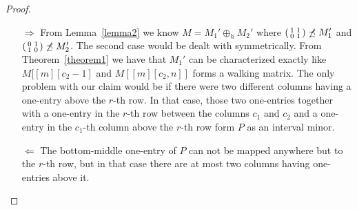 \begin{proof}
\begin{itemize}
\item[$\Rightarrow$] From Lemma~\ref{lemma2} we know $M=M_1'\oplus_hM_2'$ where $\left(\begin{smallmatrix}1&1\\0&1\end{smallmatrix}\right)\not\preceq M_1'$ and $\left(\begin{smallmatrix}0&1\\1&0\end{smallmatrix}\right)\not\preceq M_2'$. The second case would be dealt with symmetrically. From Theorem~\ref{theorem1} we have that $M_1'$ can be characterized exactly like $M[[m][c_2-1]$ and $M[[m][c_2,n]]$ forms a walking matrix. The only problem with our claim would be if there were two different columns having a one-entry above the $r$-th row. In that case, those two one-entries together with a one-entry in the $r$-th row between the columns $c_1$ and $c_2$ and a one-entry in the $c_1$-th column above the $r$-th row form $P$ as an interval minor.
\item[$\Leftarrow$] The bottom-middle one-entry of $P$ can not be mapped anywhere but to the $r$-th row, but in that case there are at most two columns having one-entries above it. %
\end{itemize}
\end{proof}